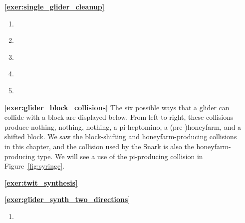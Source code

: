 \begin{multicols}{2}
\begin{itemize}[leftmargin=0em]
	\item[\bf\color{ocre}\sffamily\ref{exer:single_glider_cleanup}]
	\begin{enumerate}[leftmargin=1.5em,label=\bf\color{ocre}(\alph*)]
		\item {} \\
		
		\item {} \\
		
		\item {} \\
		
		\item {} \\
		
		\item {} \\
	\end{enumerate}
	
	
	\item[\bf\color{ocre}\sffamily\ref{exer:glider_block_collisions}] The six possible ways that a glider can collide with a block are displayed below. From left-to-right, these collisions produce nothing, nothing, nothing, a pi-heptomino, a (pre-)honeyfarm, and a shifted block. We saw the block-shifting and honeyfarm-producing collisions in this chapter, and the collision used by the Snark is also the honeyfarm-producing type. We will see a use of the pi-producing collision in Figure~\ref{fig:syringe}.
	\begin{center}
	\end{center}
	
	
	\item[\bf\color{ocre}\sffamily\ref{exer:twit_synthesis}]  \\
	

	\item[\bf\color{ocre}\sffamily\ref{exer:glider_synth_two_directions}]
	\begin{enumerate}[leftmargin=1.5em,label=\bf\color{ocre}(\alph*)]
		\item {} \\
		

\end{enumerate}
\end{itemize}
\end{multicols}
